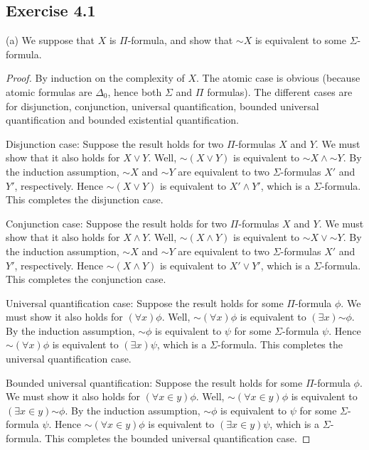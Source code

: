 \documentclass{article}
\newcommand*{\oldneg}{\mathord{\sim}}
\theoremstyle{definition}
\begin{document}
\subsection*{Exercise 4.1}

(a) We suppose that $X$ is $\Pi$-formula, and show that $\oldneg X$ is equivalent to some 
$\Sigma$-formula.

\begin{proof}
By induction on the complexity of $X$. The atomic case is obvious (because atomic formulas are $\Delta_0$, hence both 
$\Sigma$ and $\Pi$ formulas). The different cases are for disjunction, conjunction, universal quantification, 
bounded universal quantification and bounded existential quantification.

Disjunction case: Suppose the result holds for two $\Pi$-formulas $X$ and $Y$. We must show that it also holds for 
$X\vee Y$. Well, $\oldneg(X\vee Y)$ is equivalent to $\oldneg X\wedge\oldneg Y$. By the induction assumption, 
$\oldneg X$ and $\oldneg Y$ are equivalent to two $\Sigma$-formulas $X'$ and $Y'$, respectively. Hence 
$\oldneg(X\vee Y)$ is equivalent to $X'\wedge Y'$, which is a $\Sigma$-formula. This completes the disjunction case.

Conjunction case: Suppose the result holds for two $\Pi$-formulas $X$ and $Y$. We must show that it also holds for 
$X\wedge Y$. Well, $\oldneg(X\wedge Y)$ is equivalent to $\oldneg X\vee\oldneg Y$. By the induction assumption,
$\oldneg X$ and $\oldneg Y$ are equivalent to two $\Sigma$-formulas $X'$ and $Y'$, respectively. Hence
$\oldneg(X\wedge Y)$ is equivalent to $X'\vee Y'$, which is a $\Sigma$-formula. This completes the conjunction case.

Universal quantification case: Suppose the result holds for some $\Pi$-formula $\phi$. We must show it also holds for 
$(\forall x)\phi$. Well, $\oldneg(\forall x)\phi$ is equivalent to 
$(\exists x)\oldneg\phi$. By the induction assumption, $\oldneg\phi$ is equivalent to $\psi$ for some 
$\Sigma$-formula $\psi$. Hence $\oldneg(\forall x)\phi$ is equivalent to 
$(\exists x)\psi$, which is a $\Sigma$-formula. This completes the universal quantification case.

Bounded universal quantification: Suppose the result holds for some $\Pi$-formula $\phi$. We must show it 
also holds for $(\forall x\in y)\phi$. Well, $\oldneg(\forall x\in y)\phi$ is 
equivalent to $(\exists x\in y)\oldneg\phi$. By the induction assumption, $\oldneg\phi$ is equivalent to 
$\psi$ for some $\Sigma$-formula $\psi$. Hence $\oldneg(\forall x\in y)\phi$ is equivalent to
$(\exists x\in y)\psi$, which is a $\Sigma$-formula. This completes the bounded universal quantification case.


\end{proof}
\end{document}
